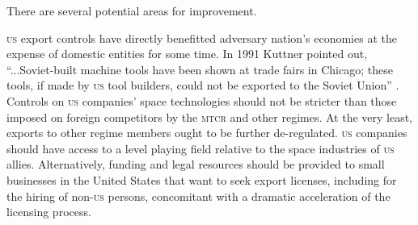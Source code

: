 \documentclass[12pt]{olfmemo}
\begin{document}

There are several potential areas for improvement.

\textsc{us} export controls have directly benefitted adversary nation's economies at the expense of domestic entities for some time. In 1991 Kuttner pointed out, ``...Soviet-built machine tools have been shown at trade fairs in Chicago; these tools, if made by \textsc{us} tool builders, could not be exported to the Soviet Union'' \citep{Kuttner1991}. Controls on \textsc{us} companies' space technologies should not be stricter than those imposed on foreign competitors by the \textsc{mtcr} and other regimes. At the very least, exports to other regime members ought to be further de-regulated. \textsc{us} companies should have access to a level playing field relative to the space industries of \textsc{us} allies. Alternatively, funding and legal resources should be provided to small businesses in the United States that want to seek export licenses, including for the hiring of non-\textsc{us} persons, concomitant with a dramatic acceleration of the licensing process.
\end{document}

